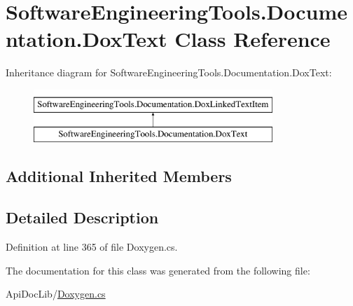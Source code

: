 \hypertarget{class_software_engineering_tools_1_1_documentation_1_1_dox_text}{\section{Software\+Engineering\+Tools.\+Documentation.\+Dox\+Text Class Reference}
\label{class_software_engineering_tools_1_1_documentation_1_1_dox_text}
}
Inheritance diagram for Software\+Engineering\+Tools.\+Documentation.\+Dox\+Text\+:\begin{figure}[H]
\begin{center}
\leavevmode
\includegraphics[height=2.000000cm]{class_software_engineering_tools_1_1_documentation_1_1_dox_text}
\end{center}
\end{figure}
\subsection*{Additional Inherited Members}


\subsection{Detailed Description}


Definition at line 365 of file Doxygen.\+cs.



The documentation for this class was generated from the following file\+:\begin{DoxyCompactItemize}
\item 
Api\+Doc\+Lib/\hyperlink{_doxygen_8cs}{Doxygen.\+cs}\end{DoxyCompactItemize}
